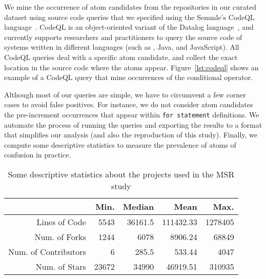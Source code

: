 We mine the occurrence of atom candidates from the repositories in our curated dataset using source code queries that we specified using the Semmle's CodeQL language~\cite{moor:gttse2007}. CodeQL is an object-oriented variant of the Datalog language~\cite{rodriguez2020efficient}, and currently supports researchers and practitioners to query the source code of systems written in different languages (such as \cpplang, Java, and JavaScript). All CodeQL queries deal with a specific atom candidate, and collect the exact location in the source code where the atoms appear. Figure~\ref{lst:codeql} shows an example of a CodeQL query that mine occurrences of the conditional operator.

Although most of our queries are simple, we have to circumvent a few corner cases to avoid false positives. For instance, we do not consider atom candidates the pre-increment occurrences that appear within
\texttt{for statement} definitions.  We automate the process of running the queries and exporting the results to a format that simplifies our analysis (and also the reproduction of this study). Finally, we compute some descriptive statistics to measure the prevalence of atoms of confusion in practice. 

\begin{table}[ht]
  \centering
   \caption{Some descriptive statistics about the projects used in the MSR study}
 \begin{tabular}{rrrrr}
   \toprule
                       & Min.             & Median        & Mean             & Max. \\ \midrule
 Lines of Code         & \num[group-separator = {,}]{5543}       & \num[group-separator = {,}]{36161.5} & \num[group-separator = {,}]{111432.33}  & \num[group-separator = {,}]{1278405} \\
 Num. of Forks         & \num[group-separator = {,}]{1244}       & \num[group-separator = {,}]{6078}    & \num[group-separator = {,}]{8906.24}    & \num[group-separator = {,}]{68849} \\
 Num. of Contributors  & \num[group-separator = {,}]{6}          & \num[group-separator = {,}]{285.5}   & \num[group-separator = {,}]{533.44}     & \num[group-separator = {,}]{4047} \\
 Num. of Stars         & \num[group-separator = {,}]{23672}      & \num[group-separator = {,}]{34990}   & \num[group-separator = {,}]{46919.51}   & \num[group-separator = {,}]{310935} \\
 
    \bottomrule
 \end{tabular}
 \label{tab:projects-statistics} 
\end{table}

